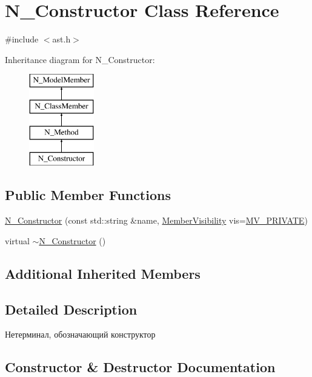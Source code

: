 \hypertarget{classN__Constructor}{}\section{N\+\_\+\+Constructor Class Reference}
\label{classN__Constructor}


{\ttfamily \#include $<$ast.\+h$>$}

Inheritance diagram for N\+\_\+\+Constructor\+:\begin{figure}[H]
\begin{center}
\leavevmode
\includegraphics[height=4.000000cm]{classN__Constructor}
\end{center}
\end{figure}
\subsection*{Public Member Functions}
\begin{DoxyCompactItemize}
\item 
\hyperlink{classN__Constructor_a24df433dc9052a31abb4672dbee60db3}{N\+\_\+\+Constructor} (const std\+::string \&name, \hyperlink{ast_8h_a8cf536792064de0e4fc620bc6f1dc90e}{Member\+Visibility} vis=\hyperlink{ast_8h_a8cf536792064de0e4fc620bc6f1dc90eae560d950ff759756c70399d8cfe015d0}{M\+V\+\_\+\+P\+R\+I\+V\+A\+T\+E})
\item 
virtual \hyperlink{classN__Constructor_a9992d88e196d85dbb3658c3d522f5f8d}{$\sim$\+N\+\_\+\+Constructor} ()
\end{DoxyCompactItemize}
\subsection*{Additional Inherited Members}


\subsection{Detailed Description}
Нетерминал, обозначающий конструктор 

\subsection{Constructor \& Destructor Documentation}
\hypertarget{classN__Constructor_a24df433dc9052a31abb4672dbee60db3}{}
